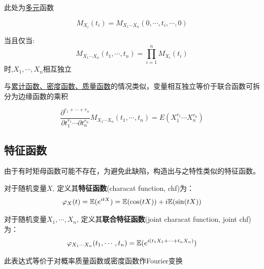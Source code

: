 \begin{remark}
    此处为\underline{多元}函数
\end{remark}

\begin{proposition}
    \[ M_{X_i}(t_i) = M_{X_1\cdots X_n}(0,\cdots ,t_i,\cdots ,0) \]
\end{proposition}

\begin{theorem}
    当且仅当:
    \[ M_{X_1\cdots X_n}(t_1,\cdots ,t_n) = \prod_{i=1}^n M_{X_i}(t_i) \]
    时,$X_1,\cdots, X_n$相互独立
\end{theorem}

\begin{remark}
    与\underline{累计函数、密度函数、质量函数}的情况类似，变量相互独立等价于联合函数可拆分为边缘函数的乘积
\end{remark}

\begin{theorem}
    \[ \frac{\partial^{r_1+\cdots +r_n} }{\partial t_1^{r_1} \cdots  \partial t_n^{r_n}} M_{X_1\cdots X_n}(t_1,\cdots ,t_n) = E(X_1^{r_1} \cdots X_n^{r_n}) \]
\end{theorem}

\subsection{特征函数}

由于有时矩母函数可能不存在，为避免此缺陷，构造出与之特性类似的特征函数。

\begin{definition}
    对于随机变量$X$, 定义其\textbf{特征函数}(characat function, chf)为：
    \[ \varphi_X(t) = \mathbb{E}(e^{itX}) = \mathbb{E}(\cos(tX)) + i\mathbb{E}(\sin(tX))\]

    对于随机变量$X_1,\cdots, X_n$, 定义其\textbf{联合特征函数}(joint characat function, joint chf)为：
    \[ \varphi_{X_1\cdots X_n}(t_1,\cdots ,t_n) = \mathbb{E}(e^{i(t_1 X_1+\cdots + t_n X_n)}) \]
\end{definition}
\begin{remark}
    此表达式等价于对概率质量函数或密度函数作Fourier变换
\end{remark}


